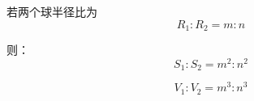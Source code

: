 \documentclass[UTF8]{ctexart}
\begin{document}
若两个球半径比为
\[
R_1:R_2=m:n
\]

则：
\[
S_1:S_2=m^2:n^2
\]

\[
V_1:V_2=m^3:n^3
\]
\end{document}
